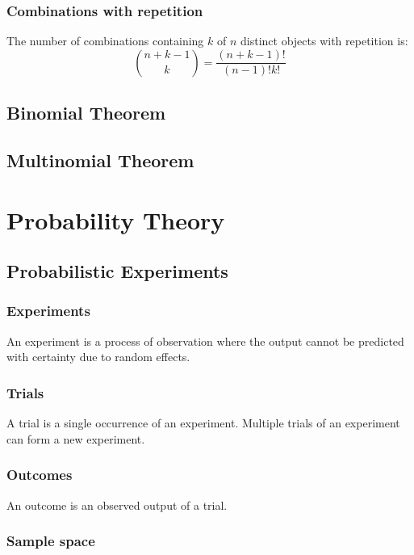 \documentclass{article}
\begin{document}
\subsubsection{Combinations with repetition}

The number of combinations containing $k$ of $n$ distinct objects with repetition is:
\[\binom{n+k-1}{k}=\frac{(n+k-1)!}{(n-1)!k!}\]

\subsection{Binomial Theorem}

\subsection{Multinomial Theorem}

\newpage
\section{Probability Theory}

\subsection{Probabilistic Experiments}

\subsubsection{Experiments}

An experiment is a process of observation where the output cannot be predicted with certainty due to random effects.

\subsubsection{Trials}

A trial is a single occurrence of an experiment. Multiple trials of an experiment can form a new experiment.

\subsubsection{Outcomes}

An outcome is an observed output of a trial.

\subsubsection{Sample space}
\end{document}
